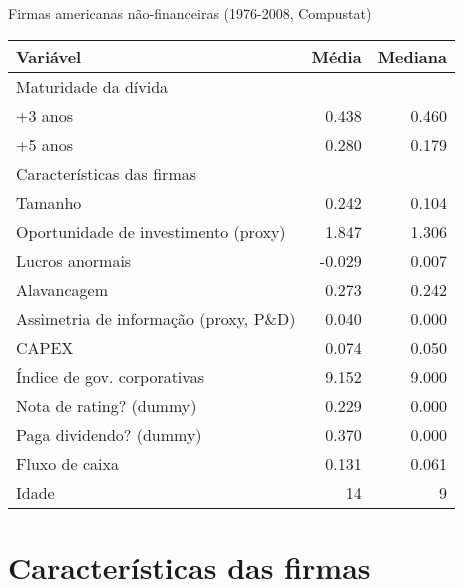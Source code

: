 \documentclass[presentation]{beamer}
\begin{document}
\begin{frame}[label={sec:orge63e05f}]{Firmas americanas não-financeiras (1976-2008, Compustat)}
\begin{center}
\begin{tabular}{lrr}
\hline
Variável & Média & Mediana\\
\hline
Maturidade da dívida &  & \\
\hline
+3 anos & 0.438 & 0.460\\
+5 anos & 0.280 & 0.179\\
\hline
Características das firmas &  & \\
\hline
Tamanho & 0.242 & 0.104\\
Oportunidade de investimento (proxy) & 1.847 & 1.306\\
Lucros anormais & -0.029 & 0.007\\
Alavancagem & 0.273 & 0.242\\
Assimetria de informação (proxy, P\&D) & 0.040 & 0.000\\
CAPEX & 0.074 & 0.050\\
Índice de gov. corporativas & 9.152 & 9.000\\
Nota de rating? (dummy) & 0.229 & 0.000\\
Paga dividendo? (dummy) & 0.370 & 0.000\\
Fluxo de caixa & 0.131 & 0.061\\
Idade & 14 & 9\\
\hline
\end{tabular}
\end{center}
\end{frame}

\section{Características das firmas}
\label{sec:org73d53cf}
\end{document}
